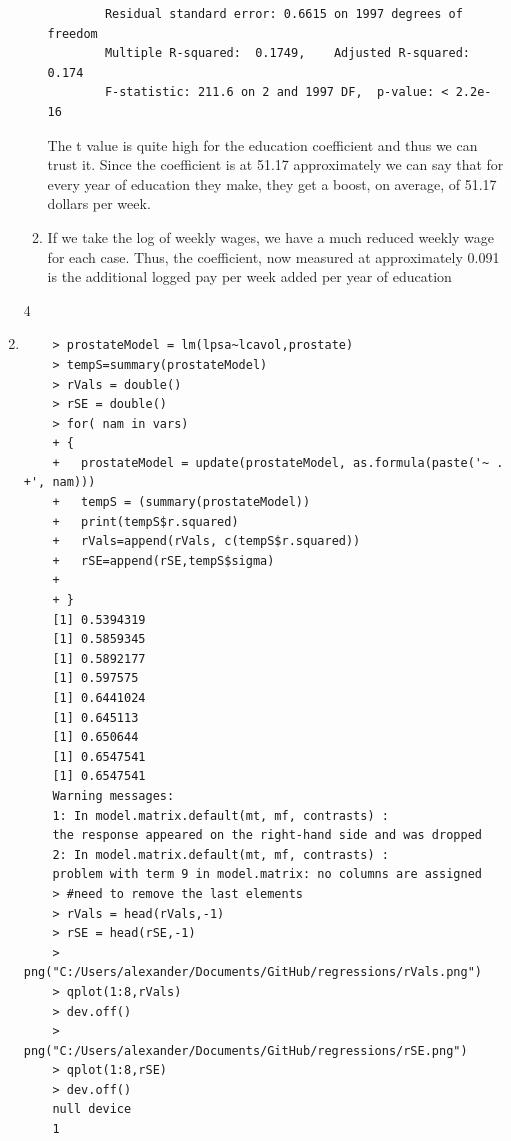 \documentclass[11pt]{article}
\begin{document}
\begin{enumerate}
\begin{enumerate}
\begin{verbatim}
		Residual standard error: 0.6615 on 1997 degrees of freedom
		Multiple R-squared:  0.1749,	Adjusted R-squared:  0.174 
		F-statistic: 211.6 on 2 and 1997 DF,  p-value: < 2.2e-16
	\end{verbatim}The t value is quite high for the education coefficient and thus we can trust it. Since the coefficient is at 51.17 approximately we can say that for every year of education they make, they get a boost, on average, of 51.17 dollars per week.
	\item If we take the log of weekly wages, we have a much reduced weekly wage for each case. Thus, the coefficient, now measured at approximately 0.091 is the additional logged pay per week added per year of education
\end{enumerate}
4
\item
\begin{verbatim}
	> prostateModel = lm(lpsa~lcavol,prostate)
	> tempS=summary(prostateModel)
	> rVals = double()
	> rSE = double()
	> for( nam in vars)
	+ {
	+   prostateModel = update(prostateModel, as.formula(paste('~ . +', nam)))
	+   tempS = (summary(prostateModel))
	+   print(tempS$r.squared)
	+   rVals=append(rVals, c(tempS$r.squared))
	+   rSE=append(rSE,tempS$sigma)
	+   
	+ }
	[1] 0.5394319
	[1] 0.5859345
	[1] 0.5892177
	[1] 0.597575
	[1] 0.6441024
	[1] 0.645113
	[1] 0.650644
	[1] 0.6547541
	[1] 0.6547541
	Warning messages:
	1: In model.matrix.default(mt, mf, contrasts) :
	the response appeared on the right-hand side and was dropped
	2: In model.matrix.default(mt, mf, contrasts) :
	problem with term 9 in model.matrix: no columns are assigned
	> #need to remove the last elements
	> rVals = head(rVals,-1)
	> rSE = head(rSE,-1)
	> png("C:/Users/alexander/Documents/GitHub/regressions/rVals.png")
	> qplot(1:8,rVals)
	> dev.off()
	> png("C:/Users/alexander/Documents/GitHub/regressions/rSE.png")
	> qplot(1:8,rSE)
	> dev.off()
	null device 
	1 
\end{verbatim}
\begin{figure}[H]
	\centering

\end{figure}
\end{enumerate}
\end{document}
